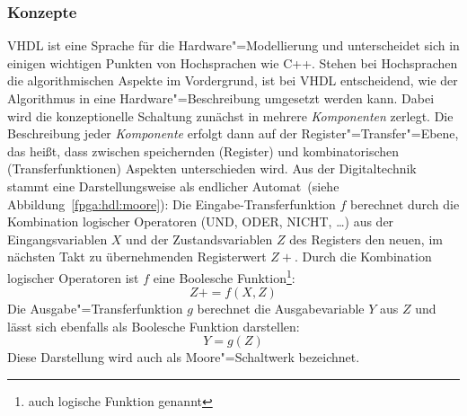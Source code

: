 \subsubsection{Konzepte}

VHDL ist eine Sprache für die Hardware"=Modellierung und unterscheidet sich in
einigen wichtigen Punkten von Hochsprachen wie C++. Stehen bei Hochsprachen
die algorithmischen Aspekte im Vordergrund, ist bei VHDL entscheidend, wie der
Algorithmus in eine Hardware"=Beschreibung umgesetzt werden kann. Dabei wird die
konzeptionelle Schaltung zunächst in mehrere \textit{Komponenten} zerlegt. Die
Beschreibung jeder \textit{Komponente} erfolgt dann auf der
Register"=Transfer"=Ebene, das heißt, dass zwischen speichernden (Register) und
kombinatorischen (Transferfunktionen) Aspekten unterschieden wird. Aus der
Digitaltechnik stammt eine Darstellungsweise als \glqq endlicher Automat\grqq\
(siehe Abbildung~\ref{fpga:hdl:moore}): Die Eingabe-Transferfunktion $f$
berechnet durch die Kombination logischer Operatoren (UND, ODER, NICHT, \ldots)
aus der Eingangsvariablen $X$ und der Zustandsvariablen $Z$ des Registers den
neuen, im nächsten Takt zu übernehmenden Registerwert $Z+$. Durch die
Kombination logischer Operatoren ist $f$ eine Boolesche Funktion\footnote{auch
logische Funktion genannt}:
%
\[
    Z+ = f(X, Z)
\]
%
Die Ausgabe"=Transferfunktion $g$ berechnet die Ausgabevariable $Y$ aus $Z$ und
lässt sich ebenfalls als Boolesche Funktion darstellen:
%
\[
    Y = g(Z)
\]
%
Diese Darstellung wird auch als Moore"=Schaltwerk bezeichnet.
\cite[vgl.][34--35]{kesel2013}
%

